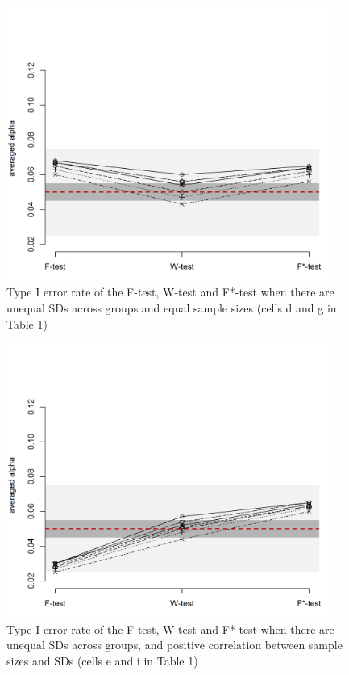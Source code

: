 \documentclass[man,floatsintext]{apa6}
\begin{document}
\begin{figure}
\includegraphics[width=400px]{Rmarkdown folder/Rmarkdown inputs/Fig1C} \caption{Type I error rate of the F-test, W-test and F*-test when there are unequal SDs across groups and equal sample sizes (cells d and g in Table 1)}\label{fig:unnamed-chunk-3}
\end{figure}

\begin{figure}
\includegraphics[width=400px]{Rmarkdown folder/Rmarkdown inputs/Fig1D} \caption{Type I error rate of the F-test, W-test and F*-test when there are unequal SDs across groups, and positive correlation between sample sizes and SDs (cells e and i in Table 1)}\label{fig:unnamed-chunk-4}
\end{figure}
\end{document}
